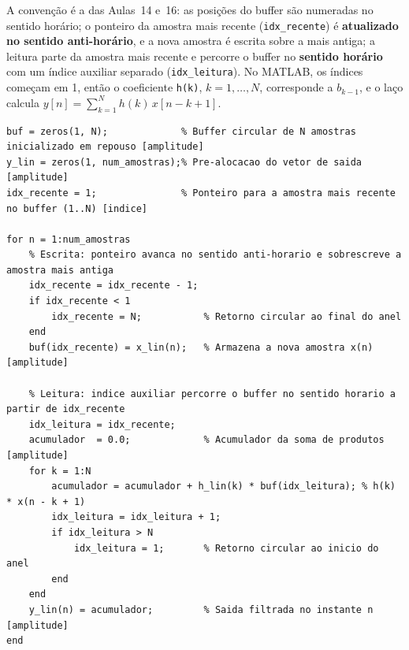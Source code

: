 \documentclass[11pt,a4paper]{article}
\begin{document}
A convenção é a das Aulas~14 e~16: as posições do buffer são numeradas no sentido horário; o ponteiro da amostra mais recente (\texttt{idx\_recente}) é \textbf{atualizado no sentido anti-horário}, e a nova amostra é escrita sobre a mais antiga; a leitura parte da amostra mais recente e percorre o buffer no \textbf{sentido horário} com um índice auxiliar separado (\texttt{idx\_leitura}). No MATLAB, os índices começam em 1, então o coeficiente \texttt{h(k)}, $k = 1, \dots, N$, corresponde a $b_{k-1}$, e o laço calcula $y[n] = \sum_{k=1}^{N} h(k)\,x[n-k+1]$.

\begin{lstlisting}[style=matlabstyle, caption={Trecho essencial de \texttt{src/fir\_circular.m}.}, label={lst:fir_circular}]
buf = zeros(1, N);             % Buffer circular de N amostras inicializado em repouso [amplitude]
y_lin = zeros(1, num_amostras);% Pre-alocacao do vetor de saida [amplitude]
idx_recente = 1;               % Ponteiro para a amostra mais recente no buffer (1..N) [indice]

for n = 1:num_amostras
    % Escrita: ponteiro avanca no sentido anti-horario e sobrescreve a amostra mais antiga
    idx_recente = idx_recente - 1;
    if idx_recente < 1
        idx_recente = N;           % Retorno circular ao final do anel
    end
    buf(idx_recente) = x_lin(n);   % Armazena a nova amostra x(n) [amplitude]

    % Leitura: indice auxiliar percorre o buffer no sentido horario a partir de idx_recente
    idx_leitura = idx_recente;
    acumulador  = 0.0;             % Acumulador da soma de produtos [amplitude]
    for k = 1:N
        acumulador = acumulador + h_lin(k) * buf(idx_leitura); % h(k) * x(n - k + 1)
        idx_leitura = idx_leitura + 1;
        if idx_leitura > N
            idx_leitura = 1;       % Retorno circular ao inicio do anel
        end
    end
    y_lin(n) = acumulador;         % Saida filtrada no instante n [amplitude]
end
\end{lstlisting}
\end{document}
